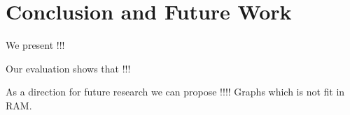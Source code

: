 \section{Conclusion and Future Work}

We present !!!

Our evaluation shows that !!!

As a direction for future research we can propose !!!!
Graphs which is not fit in RAM.
